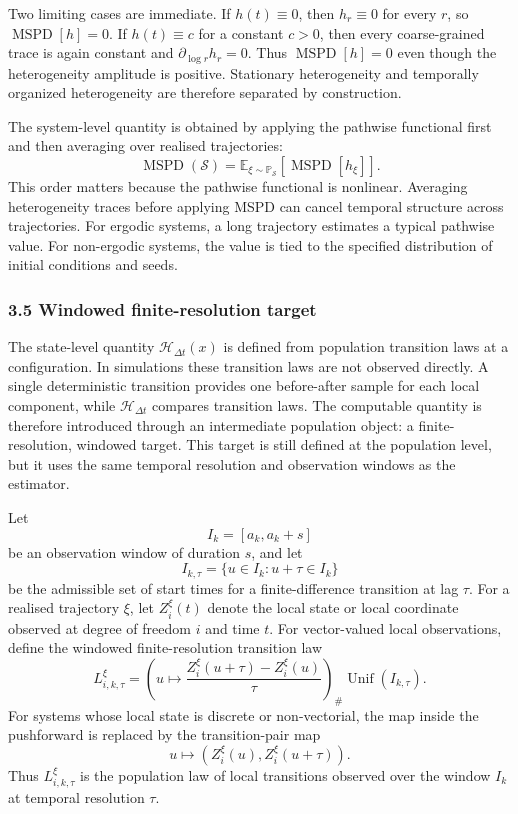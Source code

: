 Two limiting cases are immediate.  If \(h(t)\equiv0\), then \(h_r\equiv0\) for every \(r\), so \(\operatorname{MSPD}[h]=0\).  If \(h(t)\equiv c\) for a constant \(c>0\), then every coarse-grained trace is again constant and \(\partial_{\log r}h_r=0\).  Thus \(\operatorname{MSPD}[h]=0\) even though the heterogeneity amplitude is positive.  Stationary heterogeneity and temporally organized heterogeneity are therefore separated by construction.

The system-level quantity is obtained by applying the pathwise functional first and then averaging over realised trajectories:
\begin{equation}
\operatorname{MSPD}(\mathcal S)
  =
  \mathbb E_{\xi\sim\mathbb P_{\mathcal S}}
  \left[\operatorname{MSPD}[h_\xi]\right].
  \label{eq:system-level-mspd}
\end{equation}
This order matters because the pathwise functional is nonlinear.  Averaging heterogeneity traces before applying MSPD can cancel temporal structure across trajectories.  For ergodic systems, a long trajectory estimates a typical pathwise value.  For non-ergodic systems, the value is tied to the specified distribution of initial conditions and seeds.


\subsubsection*{3.5 Windowed finite-resolution target}
\label{method:windowed-target}

The state-level quantity \(\mathcal H_{\Delta t}(x)\) is defined from population transition laws at a configuration.  In simulations these transition laws are not observed directly.  A single deterministic transition provides one before-after sample for each local component, while \(\mathcal H_{\Delta t}\) compares transition laws.  The computable quantity is therefore introduced through an intermediate population object: a finite-resolution, windowed target.  This target is still defined at the population level, but it uses the same temporal resolution and observation windows as the estimator.

Let
\[
  I_k=[a_k,a_k+s]
\]
be an observation window of duration \(s\), and let
\[
  I_{k,\tau}=\{u\in I_k:u+\tau\in I_k\}
\]
be the admissible set of start times for a finite-difference transition at lag \(\tau\).  For a realised trajectory \(\xi\), let \(Z_i^\xi(t)\) denote the local state or local coordinate observed at degree of freedom \(i\) and time \(t\).  For vector-valued local observations, define the windowed finite-resolution transition law
\begin{equation}
L_{i,k,\tau}^{\xi}
  =
  \left(u\mapsto
    \frac{Z_i^\xi(u+\tau)-Z_i^\xi(u)}{\tau}
  \right)_{\#}\operatorname{Unif}(I_{k,\tau}).
  \label{eq:window-law}
\end{equation}
For systems whose local state is discrete or non-vectorial, the map inside the pushforward is replaced by the transition-pair map
\[
  u\mapsto (Z_i^\xi(u),Z_i^\xi(u+\tau)).
\]
Thus \(L_{i,k,\tau}^{\xi}\) is the population law of local transitions observed over the window \(I_k\) at temporal resolution \(\tau\).


